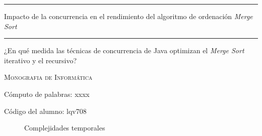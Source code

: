 \documentclass{article}
\begin{document}
	
	\begin{titlepage}
		\centering
		\hfill
		\vspace{3cm}
		
		\hrule
		\vspace{1cm}
		\onehalfspacing
		{\Huge Impacto de la concurrencia en el rendimiento del algoritmo de ordenación \textit{Merge Sort}\par}
		\vspace{1cm}
		\hrule
		
		\vspace{1cm}
		{\LARGE ¿En qué medida las técnicas de concurrencia de Java optimizan el \textit{Merge Sort} iterativo y el recursivo? \par}
		
		\vspace{1cm}
		
		{\scshape\large Monografia de Informática\par}
		
		\vspace{8cm}
		
		{\large Cómputo de palabras: xxxx \par}
		{\large Código del alumno: lqv708 \par}
		
		
	\end{titlepage}
	
	
	
	
	
	
	
	
	
	
	
	
	\begin{figure}
		\centering
		\label{fig:timeComplexities}
		\caption{Complejidades temporales}
	\end{figure}
	
\end{document}
